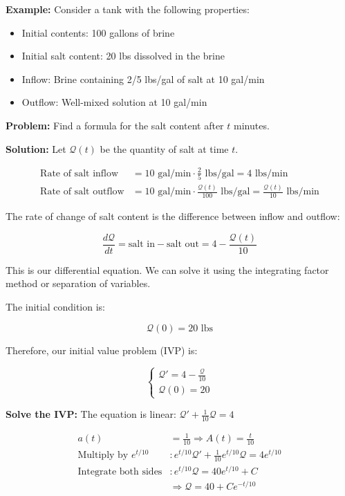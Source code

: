 \documentclass{article}
\begin{document}
\textbf{Example:} Consider a tank with the following properties:

\begin{itemize}
    \item Initial contents: 100 gallons of brine
    \item Initial salt content: 20 lbs dissolved in the brine
    \item Inflow: Brine containing 2/5 lbs/gal of salt at 10 gal/min
    \item Outflow: Well-mixed solution at 10 gal/min
\end{itemize}

\textbf{Problem:} Find a formula for the salt content after $t$ minutes.

\textbf{Solution:} Let $\mathcal{Q}(t)$ be the quantity of salt at time $t$.

\begin{align*}
    \text{Rate of salt inflow} &= 10 \text{ gal/min} \cdot \frac{2}{5} \text{ lbs/gal} = 4 \text{ lbs/min} \\
    \text{Rate of salt outflow} &= 10 \text{ gal/min} \cdot \frac{\mathcal{Q}(t)}{100} \text{ lbs/gal} = \frac{\mathcal{Q}(t)}{10} \text{ lbs/min}
\end{align*}

The rate of change of salt content is the difference between inflow and outflow:

\[
\frac{d\mathcal{Q}}{dt} = \text{salt in} - \text{salt out} = 4 - \frac{\mathcal{Q}(t)}{10}
\]

This is our differential equation. We can solve it using the integrating factor method or separation of variables.

The initial condition is:

\[
\mathcal{Q}(0) = 20 \text{ lbs}
\]

Therefore, our initial value problem (IVP) is:

\[
\begin{cases}
\mathcal{Q}' = 4 - \frac{\mathcal{Q}}{10} \\
\mathcal{Q}(0) = 20
\end{cases}
\]

\textbf{Solve the IVP:} The equation is linear: $\mathcal{Q}' + \frac{1}{10}\mathcal{Q} = 4$

\begin{align*}
    a(t) &= \frac{1}{10} \Rightarrow A(t) = \frac{t}{10} \\[6pt]
    \text{Multiply by } e^{t/10}&: e^{t/10} \mathcal{Q}' + \frac{1}{10}e^{t/10}\mathcal{Q} = 4e^{t/10} \\[6pt]
    \text{Integrate both sides}&: e^{t/10}\mathcal{Q} = 40e^{t/10} + C \\[6pt]
    &\Rightarrow \mathcal{Q} = 40 + Ce^{-t/10}
\end{align*}
\end{document}
